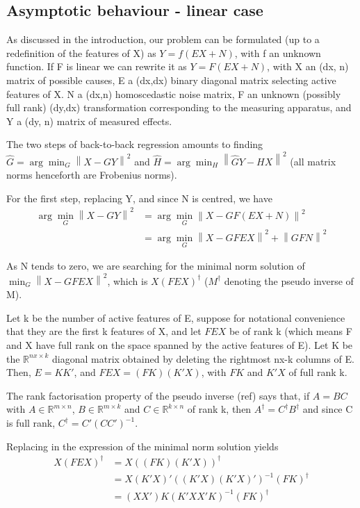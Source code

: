 \documentclass{article}
\begin{document}
\subsection{Asymptotic behaviour - linear case}
As discussed in the introduction, our problem can be formulated (up to a redefinition of the features of X) as $Y=f(EX+N)$, with f an unknown function.
%
If F is linear we can rewrite it as $Y = F(EX + N)$, with X an (dx, n) matrix of possible causes, E a (dx,dx) binary diagonal matrix selecting active features of X.
%
N a (dx,n) homoscedastic noise matrix, F an unknown (possibly full rank) (dy,dx) transformation corresponding to the measuring apparatus, and Y a (dy, n) matrix of measured effects.

The two steps of back-to-back regression amounts to finding $\hat G=\arg \min_G \left \| X-GY \right \|^2$ and $\hat H =\arg \min_H \left \| \hat GY - HX \right \|^2$ (all matrix norms henceforth are Frobenius norms).

For the first step, replacing Y, and since N is centred, we have
\begin{equation}
\begin{aligned}
\arg \min_G \left \| X-GY \right \|^2 &= \arg \min_G \left \| X - GF(EX+N)\right\|^2 \\
&{}= \arg \min_G \left \| X-GFEX\right\| ^2  + \left \| GFN\right \| ^2
\end{aligned}
\end{equation}

As N tends to zero, we are searching for the minimal norm solution of $\min_G \left \| X-GFEX\right\| ^2$, which is $X(FEX)^\dagger$ ($M^\dagger$ denoting the pseudo inverse of M).

Let k be the number of active features of E, suppose for notational convenience that they are the first k features of X, and let $FEX$ be of rank k (which means F and X have full rank on the space spanned by the active features of E). Let K be the $\mathbb{R}^{nx\times k}$ diagonal matrix obtained by deleting the rightmost nx-k columns of E. Then, $E=KK'$, and $FEX=(FK)(K'X)$, with $FK$  and $K'X$ of full rank k.

The rank factorisation property of the pseudo inverse (ref) says that, if $A=BC$ with $A\in\mathbb{R}^{m\times n}$, $B\in\mathbb{R}^{m\times k}$ and $C\in\mathbb{R}^{k\times n}$ of rank k, then $A^\dagger=C^\dagger B^\dagger$ and since C is full rank, $C^\dagger=C' (CC')^{-1}$.

Replacing in the expression of the minimal norm solution yields
\begin{equation}
\begin{aligned}
X(FEX)^\dagger &=X((FK)(K'X))^\dagger \\
&=X(K'X)'((K'X)(K'X)')^{-1}(FK)^\dagger \\
&=(XX')K(K'XX'K)^{-1}(FK)^\dagger 
\end{aligned}
\end{equation}
\end{document}

